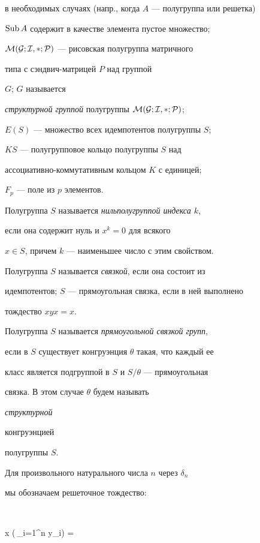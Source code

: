 в необходимых случаях (напр., когда $A$ --- полугруппа или решетка)


$\operatorname{Sub} A$ содержит в качестве элемента пустое множество;


$\cal M(G; I, \Lambda; P)$ --- рисовская полугруппа матричного


типа с сэндвич-матрицей $P$ над группой


$G$; $G$ называется


{\em структурной группой} полугруппы $\cal M(G; I, \Lambda; P)$;


$E(S)$ --- множество всех идемпотентов полугруппы $S$;


$KS$ --- полугрупповое кольцо полугруппы $S$ над


ассоциативно-коммутативным кольцом $K$ с единицей;


$F_p$ --- поле из $p$ элементов.





Полугруппа $S$ называется {\em нильполугруппой индекса $k$},


если она содержит нуль и $x^k = 0$ для всякого


$x \in S$, причем $k$ --- наименьшее число с этим свойством.





Полугруппа $S$ называется {\em связкой}, если она состоит из


идемпотентов; $S$ --- прямоугольная связка, если в ней выполнено


тождество $xyx = x$.





Полугруппа $S$ называется {\em прямоугольной связкой групп},


если в $S$ существует конгруэнция $\theta$ такая, что каждый ее


класс является подгруппой в $S$ и $S / \theta$ --- прямоугольная


связка. В этом случае $\theta$ будем называть {\em структурной


конгруэнцией} полугруппы $S$.





Для произвольного натурального числа $n$ через $\delta_n$


мы обозначаем решеточное тождество:


$$


x \wedge \biggl(\,\bigvee_{i=1}^n y_i\biggr) =


